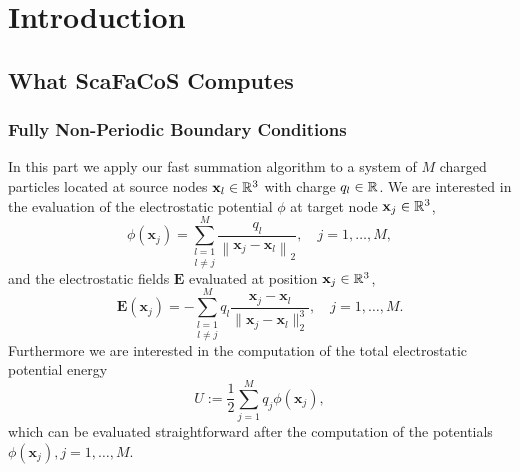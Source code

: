 \chapter{Introduction}
\label{cha:introduction}


\section{What ScaFaCoS Computes}

\subsection{Fully Non-Periodic Boundary Conditions}
In this part we apply our fast summation algorithm to a system
of $M$ charged particles located at source nodes $\mathbf x_l\in \mathbb{R}^3$ with charge $q_l\in\mathbb{R}$.
We are interested in the evaluation of the electrostatic potential $\phi$ at target node $\mathbf x_j\in \mathbb{R}^3$,
\begin{equation}\label{eq:potential_0dp}
 \phi (\mathbf x_j) = \underset{l \neq j}{\sum_{l=1}^{M}} \dfrac{q_l}{\left\| \mathbf x_j - \mathbf x_l \right\|_2},
 \quad j=1,\hdots,M,
\end{equation}
and the electrostatic fields $\mathbf E$ evaluated at position $\mathbf x_j\in \mathbb{R}^3$,
\begin{equation}\label{eq:fields_0dp}
   \mathbf E(\mathbf x_j)
   = - \underset{l\neq j}{\sum_{l=1}^{M}} q_l \frac{\mathbf x_j - \mathbf x_l}{\|\mathbf x_j - \mathbf x_l \|_2^3},
   \quad j=1,\hdots,M.
\end{equation}
Furthermore we are interested in the computation of the total electrostatic potential energy
\begin{equation*}
  U := \frac{1}{2} \sum\limits_{j = 1}^{M} q_j \phi(\mathbf x_j),
\end{equation*}
which can be evaluated straightforward after the computation of the potentials $\phi(\mathbf x_j), j=1,\hdots,M$.

